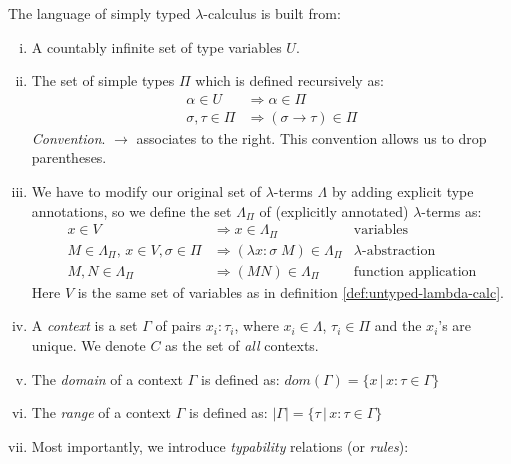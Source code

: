\begin{definition}
The language of simply typed $\lambda$-calculus is built from:
    \begin{enumerate}[(i)]
        \item A countably infinite set of type variables $U$.
        \item The set of simple types $\Pi$ which is defined recursively as:
        \begin{align*}
            \alpha \in U &\Rightarrow \alpha \in \Pi \\
            \sigma, \tau \in \Pi &\Rightarrow (\sigma \to \tau) \in \Pi
        \end{align*}
            \emph{Convention}. $\to$ associates to the right. This convention
            allows us to drop parentheses.
        \item We have to modify our original set of $\lambda$-terms $\Lambda$
            by adding explicit type annotations, so we define the set
            $\Lambda_\Pi$ of (explicitly annotated) $\lambda$-terms as:
                \begin{align*}
                    x \in V & \Rightarrow x \in \Lambda_\Pi &
                        \text{variables} \\
                    M \in \Lambda_\Pi,\, x \in V, \sigma \in \Pi & \Rightarrow
                    (\lambda x\!:\!\sigma\; M) \in \Lambda_\Pi &
                        \text{$\lambda$-abstraction} \\
                    M, N \in \Lambda_\Pi & \Rightarrow (M N) \in \Lambda_\Pi &
                        \text{function application}
                \end{align*}
                Here $V$ is the same set of variables as in definition
                \ref{def:untyped-lambda-calc}.
        \item A \emph{context} is a set $\Gamma$ of pairs $x_i: \tau_i$, where $x_i \in
        \Lambda$, $\tau_i \in \Pi$ and the $x_i$'s are unique. We denote $C$ as
        the set of \emph{all} contexts.
        \item The \emph{domain} of a context $\Gamma$ is defined as:
            $dom(\Gamma) = \{x\,|\, x:\tau \in \Gamma \}$
        \item The \emph{range} of a context $\Gamma$ is defined as:
            $|\Gamma| = \{ \tau \,|\, x:\tau \in \Gamma\}$
        \item Most importantly, we introduce \emph{typability} relations (or
        \emph{rules}):


\end{enumerate}
\end{definition}
